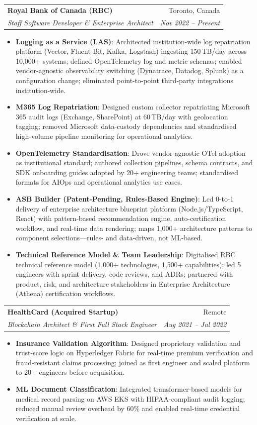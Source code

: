 \documentclass[letterpaper,9.5pt]{article}
\makeatletter
\newcommand{\resumeItem}[2]{\item\small{\textbf{#1}{: #2 \vspace{-2pt}}}}
\newcommand{\resumeSubheading}[4]{\vspace{-2pt}\item\begin{tabular*}{0.97\textwidth}{l@{\extracolsep{\fill}}r}\textbf{#1} & #2 \\\textit{\small#3} & \textit{\small #4} \\\end{tabular*}\vspace{-6pt}}
\newcommand{\resumeItemListStart}{\begin{itemize}}
\newcommand{\resumeItemListEnd}{\end{itemize}\vspace{-6pt}}
\makeatother
\begin{document}
  \resumeSubheading
    {Royal Bank of Canada (RBC)}{Toronto, Canada}
    {Staff Software Developer \& Enterprise Architect}{Nov 2022 -- Present}
  \resumeItemListStart
    \resumeItem{Logging as a Service (LAS)}
      {Architected institution-wide log repatriation platform (Vector, Fluent Bit, Kafka, Logstash) ingesting 150\,TB/day across 10,000+ systems; defined OpenTelemetry log and metric schemas; enabled vendor-agnostic observability switching (Dynatrace, Datadog, Splunk) as a configuration change; eliminated point-to-point third-party integrations institution-wide.}
    \resumeItem{M365 Log Repatriation}
      {Designed custom collector repatriating Microsoft 365 audit logs (Exchange, SharePoint) at 60\,TB/day with geolocation tagging; removed Microsoft data-custody dependencies and standardised high-volume pipeline monitoring for operational analytics.}
    \resumeItem{OpenTelemetry Standardisation}
      {Drove vendor-agnostic OTel adoption as institutional standard; authored collection pipelines, schema contracts, and SDK onboarding guides adopted by 20+ engineering teams; standardised formats for AIOps and operational analytics use cases.}
    \resumeItem{ASB Builder (Patent-Pending, Rules-Based Engine)}
      {Led 0-to-1 delivery of enterprise architecture blueprint platform (Node.js/TypeScript, React) with pattern-based recommendation engine, auto-certification workflow, and real-time data rendering; maps 1,000+ architecture patterns to component selections---rules- and data-driven, not ML-based.}
    \resumeItem{Technical Reference Model \& Team Leadership}
      {Digitalised RBC technical reference model (1,000+ technologies, 1,500+ capabilities); led 5 engineers with sprint delivery, code reviews, and ADRs; partnered with product, risk, and architecture stakeholders in Enterprise Architecture (Athena) certification workflows.}
  \resumeItemListEnd

  \resumeSubheading
    {HealthCard (Acquired Startup)}{Remote}
    {Blockchain Architect \& First Full Stack Engineer}{Aug 2021 -- Jul 2022}
  \resumeItemListStart
    \resumeItem{Insurance Validation Algorithm}
      {Designed proprietary validation and trust-score logic on Hyperledger Fabric for real-time premium verification and fraud-resistant claims processing; joined as first engineer and scaled platform to 20+ engineers before acquisition.}
    \resumeItem{ML Document Classification}
      {Integrated transformer-based models for medical record parsing on AWS EKS with HIPAA-compliant audit logging; reduced manual review overhead by 60\% and enabled real-time credential verification at scale.}
  \resumeItemListEnd
\end{document}
